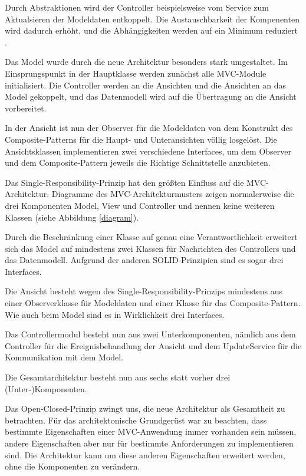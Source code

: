\documentclass{vldb}
\begin{document}
Durch Abstraktionen wird der Controller beispielsweise vom Service zum Aktualsieren der Modeldaten entkoppelt. Die Aus\-tausch\-bar\-keit der Kompenenten wird dadurch erhöht, und die Ab\-hän\-gig\-keiten werden auf ein Minimum reduziert \cite[S.~2]{Liskov1987}.

Das Model wurde durch die neue Architektur besonders stark umgestaltet. Im Einsprungspunkt in der Hauptklasse werden zunächst alle MVC-Module initialisiert. Die Controller werden an die Ansichten und die Ansichten an das Model gekoppelt, und das Datenmodell wird auf die Über\-tragung an die Ansicht vorbereitet.

In der Ansicht ist nun der Observer für die Modeldaten von dem Konstrukt des Composite-Patterns für die Haupt- und Unteransichten völlig losgelöst. Die Ansichtsklassen implementieren zwei verschiedene Interfaces, um dem Observer und dem Composite-Pattern jeweils die Richtige Schnittstelle anzubieten.

Das Single-Responsibility-Prinzip hat den größten Einfluss auf die MVC-Architektur. Diagramme des MVC-Ar\-chi\-tek\-tur\-mus\-ters %
zeigen normalerweise die drei Komponenten Model, View und Controller und nennen keine weiteren Klassen (siehe Abbildung \ref{diagram}).

Durch die Beschränkung einer Klasse auf genau eine Verantwortlichkeit erweitert sich das Model auf mindestens zwei Klassen für Nachrichten des Controllers und das Datenmodell. Aufgrund der anderen SOLID-Prinzipien sind es sogar drei Interfaces.

Die Ansicht besteht wegen des Single-Responsibility-Prin\-zips mindestens aus einer Observerklasse für Modeldaten und einer Klasse für das Composite-Pattern. Wie auch beim Model sind es in Wirklichkeit drei Interfaces.

Das Controllermodul besteht nun aus zwei Unterkomponenten, nämlich aus dem Controller für die Ereignisbehandlung der Ansicht und dem UpdateService für die Kommunikation mit dem Model.

Die Gesamtarchitektur besteht nun aus sechs statt vorher drei (Unter-)Komponenten.

Das Open-Closed-Prinzip zwingt uns, die neue Architektur als Gesamtheit zu betrachten. Für das architektonische Grundgerüst war zu beachten, dass bestimmte Eigenschaften einer MVC-Anwendung immer vorhanden sein müs\-sen, andere Eigenschaften aber nur für bestimmte Anfor\-de\-run\-gen zu implementieren sind. Die Architektur kann um diese anderen Eigenschaften erweitert werden, ohne die Komponenten zu verändern.
\end{document}
